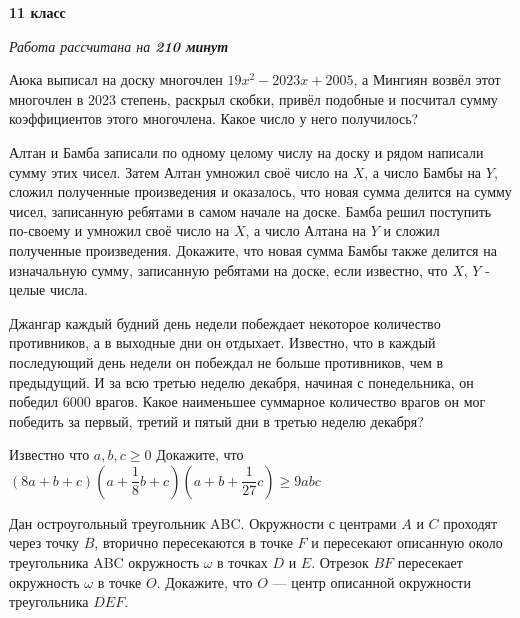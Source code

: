 \hspace{3mm}

\centerline{\bf \huge 11 класс}
\centerline{\normalsize{\it Работа рассчитана на \bf{210} минут}}

\hspace{3mm}

Аюка выписал на доску многочлен $19x^2 - 2023x + 2005$, а Мингиян возвёл этот многочлен в $2023$ степень, раскрыл скобки, привёл подобные и посчитал сумму коэффициентов этого многочлена. Какое число у него получилось?

\hspace{3mm}

Алтан и Бамба записали по одному целому числу на доску и рядом написали сумму этих чисел. Затем Алтан умножил своё число на $X$, а число Бамбы на $Y$, сложил полученные произведения и оказалось, что новая сумма делится на сумму чисел, записанную ребятами в самом начале на доске. Бамба решил поступить по-своему и умножил своё число на $X$, а число Алтана на $Y$ и сложил полученные произведения. Докажите, что новая сумма Бамбы также делится на изначальную сумму, записанную ребятами на доске, если известно, что $X$, $Y$ - целые числа.

\hspace{3mm}

Джангар каждый будний день недели побеждает некоторое количество противников, а в выходные дни он отдыхает. Известно, что в каждый последующий день недели он побеждал не больше противников, чем в предыдущий. И за всю третью неделю декабря, начиная с понедельника, он победил 6000 врагов. Какое наименьшее суммарное количество врагов он мог победить за первый, третий и пятый дни в третью неделю декабря? 

\hspace{3mm}

Известно что $a, b, c \geq 0$
Докажите, что $(8a + b + c)(a + \dfrac{1}{8}b + c)(a + b + \dfrac{1}{27} c ) \geq 9abc$

\hspace{3mm}

Дан остроугольный треугольник ABC. Окружности с центрами $A$ и $C$ проходят через точку
$B$, вторично пересекаются в точке $F$ и пересекают описанную около треугольника ABC окружность $\omega$
в точках $D$ и $E$. Отрезок $BF$ пересекает окружность $\omega$ в точке $O$. Докажите, что $O$ — центр описанной
окружности треугольника $DEF$.
